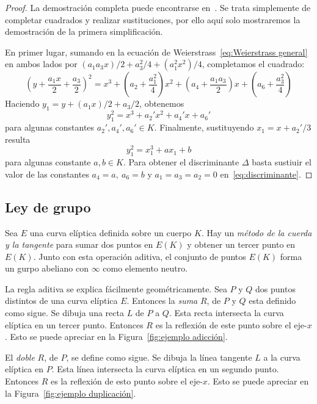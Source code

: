 \begin{proof}
La demostración completa puede encontrarse en~\cite[sec. III.1]{Silverman:2009}. Se trata simplemente de completar cuadrados y realizar sustituciones, por ello aquí solo mostraremos la demostración de la primera simplificación.

En primer lugar, sumando en la ecuación de Weierstrass~\eqref{eq:Weierstrass general} en ambos lados por $(a_1 a_3 x)/2 + a_3^2/4 + (a_1^2 x^2)/4$, completamos el cuadrado:
$$
\left(y + \frac{a_1 x}{2} + \frac{a_3}{2}\right)^2 = x^3 + \left(a_2 + \frac{a_1^2}{4}\right)x^2 + \left(a_4 + \frac{a_1 a_3}{2}\right)x + \left(a_6 + \frac{a_3^2}{4}\right)
$$
Haciendo $y_1 = y + (a_1 x)/2 + a_3/2$, obtenemos
$$
y_1^2 = x^3 + a_2' x^2 + a_4' x + a_6'
$$
para algunas constantes $a_2', a_4', a_6' \in K$. Finalmente, sustituyendo $x_1 = x + a_2'/3$ resulta
$$
y_1^2 = x_1^3 + a x_1 + b
$$
para algunas constante $a, b \in K$. Para obtener el discriminante $\Delta$ basta sustiuir el valor de las constantes $a_4 = a,\ a_6 = b$ y $a_1 = a_3 = a_2 = 0$ en~\eqref{eq:discriminante}.
\end{proof}

\subsection{Ley de grupo}
\label{sub:Ley de grupo}

Sea $E$ una curva elíptica definida sobre un cuerpo $K$. Hay un \emph{método de la cuerda y la tangente} para sumar dos puntos en $E(K)$ y obtener un tercer punto en $E(K)$. Junto con esta operación aditiva, el conjunto de puntos $E(K)$ forma un gurpo abeliano con $\infty$ como elemento neutro.

La regla aditiva se explica fácilmente geométricamente. Sea $P$ y $Q$ dos puntos distintos de una curva elíptica $E$. Entonces la \emph{suma} $R$, de $P$ y $Q$ esta definido como sigue. Se dibuja una recta $L$ de $P$ a $Q$. Esta recta intersecta la curva elíptica en un tercer punto. Entonces $R$ es la reflexión de este punto sobre el eje-$x$. Esto se puede apreciar en la Figura~\ref{fig:ejemplo adicción}.

El \emph{doble} $R$, de $P$, se define como sigue. Se dibuja la línea tangente $L$ a la curva elíptica en $P$. Esta línea intersecta la curva elíptica en un segundo punto. Entonces $R$ es la reflexión de esto punto sobre el eje-$x$. Esto se puede apreciar en la Figura~\ref{fig:ejemplo duplicación}.

